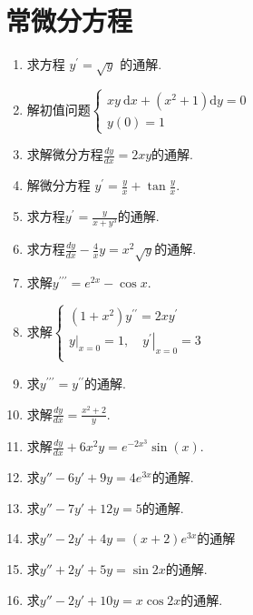 \newpage

\section{常微分方程} 
\begin{enumerate}
	\item 求方程 $y^{\prime}=\sqrt{y}$ 的通解.

	\item 解初值问题$ \left\{\begin{array}{l} x y \mathrm{~d} x+\left(x^{2}+1\right) \mathrm{d} y=0 \\ y(0)=1 \end{array}\right.$
	
	\item 求解微分方程$\frac{d y}{d x}=2 x y$的通解.

	
	\item 解微分方程 $y^{\prime}=\frac{y}{x}+\tan \frac{y}{x}$.

	
	\item 求方程$ y^{\prime}=\frac{y}{x+y^{3}} $的通解.

	\item 求方程$ \frac{d y}{d x}-\frac{4}{x} y=x^{2} \sqrt{y} $的通解.

	
	\item 求解$ y^{\prime\prime\prime}=e^{2x}-\cos x$.

	\item 求解$ \left\{ \begin{array}{l} \left( 1+x^2 \right) y^{\prime\prime}=2xy^{\prime}\\ \left. y \right|_{x=0}=1,\left. \quad y^{\prime} \right|_{x=0}=3\\ \end{array} \right.$

	
	\item 求$ y^{\prime\prime\prime}=y^{\prime\prime} $的通解.

	
	\item 求解$\frac{dy}{dx} = \frac{x^2+2}{y}$.

	
	\item 求解$\frac{dy}{dx} + 6x^2y = e^{-2x^3}\sin(x)$.

	\item 求$y''-6y'+9y=4e^{3x}$的通解.

	\item 求$y''-7y'+12y=5$的通解.
	
	\item 求$y''-2y'+4y=(x+2)e^{3x}$的通解

	\item 求$y''+2y'+5y=\sin 2x$的通解.

	\item 求$y''-2y'+10y=x\cos 2x$的通解.

	
\end{enumerate}
